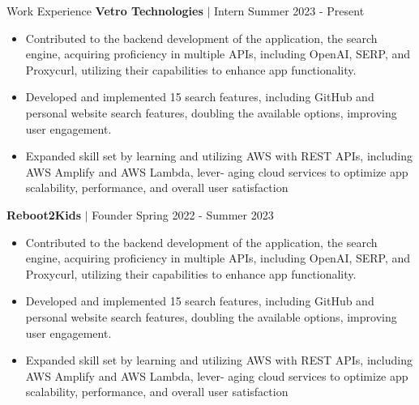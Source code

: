 \documentclass{resume} %
\begin{document}
\begin{rSection}{Work Experience}
{\textbf{Vetro Technologies} $\vert$ Intern} \hfill Summer 2023 - Present \\\vspace{-1.5em}
\begin{itemize}
\item Contributed to the backend development of the application, the search engine, acquiring proficiency in multiple APIs, including OpenAI, SERP, and Proxycurl, utilizing their capabilities to enhance app functionality.
\vspace{-0.4em}
\item Developed and implemented 15 search features, including GitHub and personal website search features, doubling the available options, improving user engagement.
\vspace{-0.4em}
\item Expanded skill set by learning and utilizing AWS with REST APIs, including AWS Amplify and AWS Lambda, lever- aging cloud services to optimize app scalability, performance, and overall user satisfaction
\vspace{-0.4em}
\end{itemize}
{\textbf{Reboot2Kids} $\vert$ Founder} \hfill Spring 2022 - Summer 2023 \\\vspace{-1.5em}
\begin{itemize}
\item Contributed to the backend development of the application, the search engine, acquiring proficiency in multiple APIs, including OpenAI, SERP, and Proxycurl, utilizing their capabilities to enhance app functionality.
\vspace{-0.4em}
\item Developed and implemented 15 search features, including GitHub and personal website search features, doubling the available options, improving user engagement.
\vspace{-0.4em}
\item Expanded skill set by learning and utilizing AWS with REST APIs, including AWS Amplify and AWS Lambda, lever- aging cloud services to optimize app scalability, performance, and overall user satisfaction
\vspace{-0.4em}
\end{itemize}
\end{rSection}


\end{document}
